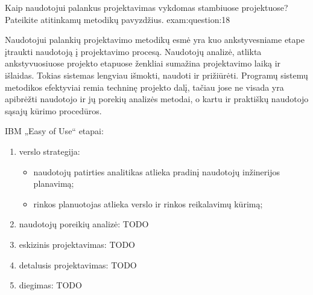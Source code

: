 \begin{question}{%
  Kaip naudotojui palankus projektavimas vykdomas stambiuose projektuose?
  Pateikite atitinkamų metodikų pavyzdžius.
  }{exam:question:18}

  Naudotojui palankių projektavimo metodikų esmė yra kuo ankstyvesniame
  etape įtraukti naudotoją į projektavimo procesą. Naudotojų analizė,
  atlikta ankstyvuosiuose projekto etapuose ženkliai sumažina projektavimo
  laiką ir išlaidas. Tokias sistemas lengviau išmokti, naudoti ir
  prižiūrėti. Programų sistemų metodikos efektyviai remia techninę
  projekto dalį, tačiau jose ne visada yra apibrėžti naudotojo ir jų
  porekių analizės metodai, o kartu ir praktiškų naudotojo sąsajų
  kūrimo procedūros.\cite[165p.]{konspektas}

  IBM „Easy of Use“ etapai:
  \begin{enumerate}
    \item verslo strategija:
      \begin{itemize}
        \item naudotojų patirties analitikas atlieka pradinį naudotojų
          inžinerijos planavimą;
        \item rinkos planuotojas atlieka verslo ir rinkos reikalavimų
          kūrimą;
      \end{itemize}
    \item naudotojų poreikių analizė:
      TODO \cite[39]{skaidres-7}
    \item eskizinis projektavimas:
      TODO \cite[40]{skaidres-7}
    \item detalusis projektavimas:
      TODO \cite[41]{skaidres-7}
    \item diegimas:
      TODO \cite[42]{skaidres-7}
  \end{enumerate}


\end{question}
